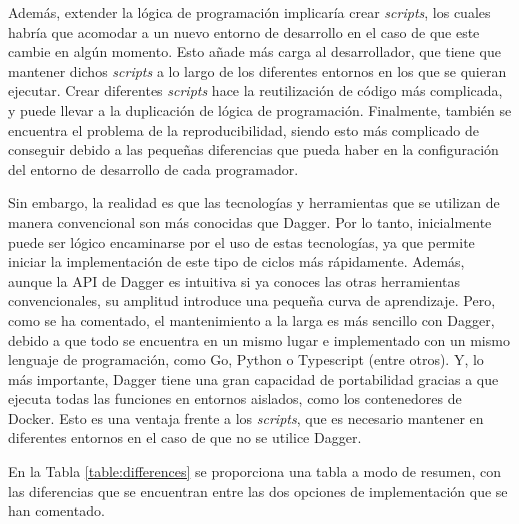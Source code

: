 Además, extender la lógica de programación implicaría crear \textit{scripts}, los cuales habría que acomodar a un nuevo entorno de desarrollo en el caso de que este cambie en algún momento. Esto añade más carga al desarrollador, que tiene que mantener dichos \textit{scripts} a lo largo de los diferentes entornos en los que se quieran ejecutar. Crear diferentes \textit{scripts} hace la reutilización de código más complicada, y puede llevar a la duplicación de lógica de programación. Finalmente, también se encuentra el problema de la reproducibilidad, siendo esto más complicado de conseguir debido a las pequeñas diferencias que pueda haber en la configuración del entorno de desarrollo de cada programador.

Sin embargo, la realidad es que las tecnologías y herramientas que se utilizan de manera convencional son más conocidas que Dagger. Por lo tanto, inicialmente puede ser lógico encaminarse por el uso de estas tecnologías, ya que permite iniciar la implementación de este tipo de ciclos más rápidamente. Además, aunque la API de Dagger es intuitiva si ya conoces las otras herramientas convencionales, su amplitud introduce una pequeña curva de aprendizaje. Pero, como se ha comentado, el mantenimiento a la larga es más sencillo con Dagger, debido a que todo se encuentra en un mismo lugar e implementado con un mismo lenguaje de programación, como Go, Python o Typescript (entre otros). Y, lo más importante, Dagger tiene una gran capacidad de portabilidad gracias a que ejecuta todas las funciones en entornos aislados, como los contenedores de Docker. Esto es una ventaja frente a los \textit{scripts}, que es necesario mantener en diferentes entornos en el caso de que no se utilice Dagger.

En la Tabla \ref{table:differences} se proporciona una tabla a modo de resumen, con las diferencias que se encuentran entre las dos opciones de implementación que se han comentado.

